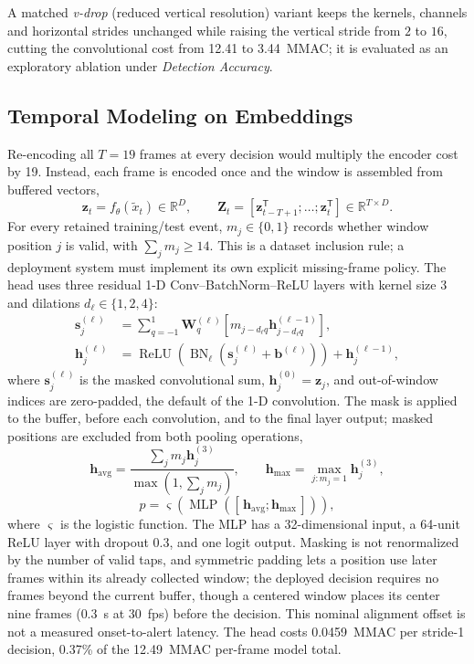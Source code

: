\documentclass{IEEEmce}
\begin{document}
A matched \emph{v-drop} (reduced vertical resolution) variant keeps the kernels,
channels and horizontal strides unchanged while raising the vertical stride from $2$ to
$16$, cutting the convolutional cost from 12.41 to 3.44~MMAC; it is evaluated as an
exploratory ablation under \emph{Detection Accuracy}.

\subsection{Temporal Modeling on Embeddings}
\label{sec_temporal}
Re-encoding all $T=19$ frames at every decision would multiply the encoder cost by 19.
Instead, each frame is encoded once and the window is assembled from buffered vectors,
\begin{equation}
\bm z_t=f_\theta(\tilde{x}_t)\in\mathbb R^D,\qquad
\bm Z_t=[\bm z_{t-T+1}^{\mathsf T};\ldots;\bm z_t^{\mathsf T}]
\in\mathbb R^{T\times D}.
\label{eq:buffer}
\end{equation}
For every retained training/test event, $m_j\in\{0,1\}$ records whether window position
$j$ is valid, with $\sum_jm_j\ge14$. This is a dataset inclusion rule; a deployment
system must implement its own explicit missing-frame policy. The head uses
three residual 1-D Conv--BatchNorm--ReLU layers with kernel size 3 and dilations
$d_\ell\in\{1,2,4\}$:
\begin{equation}
\begin{aligned}
\bm s_j^{(\ell)}
&=\sum_{q=-1}^{1}\bm W_q^{(\ell)}
 [m_{j-d_\ell q}\bm h_{j-d_\ell q}^{(\ell-1)}],\\
\bm h_j^{(\ell)}
&=\operatorname{ReLU}\!\left(
\operatorname{BN}_\ell\!\left(\bm s_j^{(\ell)}+\bm b^{(\ell)}\right)\right)
+\bm h_j^{(\ell-1)},
\end{aligned}
\label{eq:tcn}
\end{equation}
where $\bm s_j^{(\ell)}$ is the masked convolutional sum,
$\bm h_j^{(0)}=\bm z_j$, and out-of-window indices are zero-padded, the default of
the 1-D convolution. The mask is applied to the buffer, before each convolution, and to
the final layer output; masked positions are excluded from both pooling operations,
\begin{equation}
\bm h_{\mathrm{avg}}=\frac{\sum_jm_j\bm h_j^{(3)}}{\max(1,\sum_jm_j)},
\qquad
\bm h_{\mathrm{max}}=\max_{j:m_j=1}\bm h_j^{(3)},
\label{eq:pooling}
\end{equation}
\begin{equation}
p=\varsigma\!\left(\operatorname{MLP}
([\,\bm h_{\mathrm{avg}};\bm h_{\mathrm{max}}\,])\right),
\label{eq:readout}
\end{equation}
where $\varsigma$ is the logistic function. The MLP has a 32-dimensional input, a
64-unit ReLU layer with dropout 0.3, and one logit output. Masking is not renormalized
by the number of valid taps, and symmetric padding lets a position use later frames
within its already collected window; the deployed decision requires no frames beyond the
current buffer, though a centered window places its center nine frames ($0.3$~s at 30~fps) before the decision.
This nominal alignment offset is not a measured onset-to-alert latency. The head costs 0.0459~MMAC per stride-1 decision, 0.37\% of the
12.49~MMAC per-frame model total.
\end{document}
